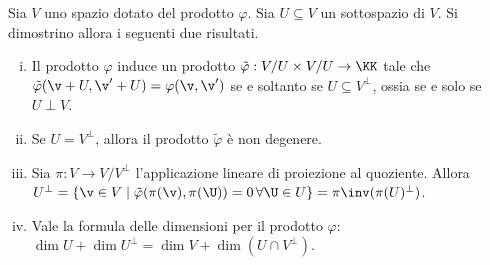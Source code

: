 \documentclass[11pt]{article}
\begin{document}
	\begin{exercise}
		Sia $V$ uno spazio dotato del prodotto $\varphi$. Sia
		$U \subseteq V$ un sottospazio di $V$. Si dimostrino allora i seguenti due
		risultati.
		
		\begin{enumerate}[(i)]
			\item Il prodotto $\varphi$
			induce un prodotto $\tilde \varphi : V/U \times V/U \to \KK$ tale che
			$\tilde \varphi(\v + U, \v' + U) = \varphi(\v, \v')$ se e soltanto se $U \subseteq V^\perp$, ossia
			se e solo se $U \perp V$.
			
			\item Se $U = V^\perp$, allora il prodotto $\tilde \varphi$ è non degenere.
			
			\item Sia $\pi : V \to V/V^\perp$ l'applicazione lineare di proiezione al quoziente. Allora
			$U^\perp = \{ \v \in V \mid \tilde \varphi(\pi(\v), \pi(\U)) = 0 \, \forall \U \in U \} = \pi\inv(\pi(U)^\perp)$.
			
			\item Vale la formula delle dimensioni per il prodotto $\varphi$: $\dim U + \dim U^\perp = \dim V + \dim (U \cap V^\perp)$.   
		\end{enumerate}
	\end{exercise}
	
\end{document}
